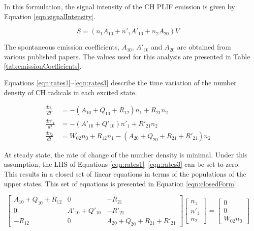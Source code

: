 In this formulation, the signal intensity of the CH PLIF emission is given by Equation \ref{eqn:signalIntensity}.

\begin{equation}
S = ( n_1A_{10} + n'_1A'_{10} + n_2A_{20} )V
\label{eqn:signalIntensity}
\end{equation}

The spontaneous emission coefficients, \(A_{10}\), \(A'_{10}\) and \(A_{20}\) are obtained from various published papers\cite{1985-garland-a,1996-luque-b,2005-richmond}.
The values used for this analysis are presented in Table \ref{tab:emissionCoefficients}.



Equations \ref{eqn:rates1}--\ref{eqn:rates3} describe the time variation of the number density of CH radicals in each excited state.

\begin{align}
\frac{dn_1}{dt} &= -( A_{10} + Q_{10} + R_{12} )n_1 + R_{21}n_2
\label{eqn:rates1}\\
\frac{dn'_1}{dt} &= -( A'_{10} + Q'_{10} )n'_1 + R'_{21}n_2
\label{eqn:rates2}\\
\frac{dn_2}{dt} &= W_{02}n_0 + R_{12}n_1 - ( A_{20} + Q_{20} + R_{21} + R'_{21} )n_2
\label{eqn:rates3}
\end{align}

At steady state, the rate of change of the number density is minimal.
Under this assumption, the LHS of Equations \ref{eqn:rates1}--\ref{eqn:rates3} can be set to zero.
This results in a closed set of linear equations in terms of the populations of the upper states.
This set of equations is presented in Equation \ref{eqn:closedForm}.

\begin{equation}
  \left[
    \begin{matrix}
      A_{10} + Q_{10} + R_{12} & 0 & -R_{21}\\
      0 & A'_{10} + Q'_{10} & -R'_{21}\\
      -R_{12} & 0 & A_{20} + Q_{20} + R_{21} + R'_{21}
    \end{matrix}
  \right]\left[
    \begin{matrix}
      n_1\\
      n'_1\\
      n_2
    \end{matrix}
  \right] = \left[
    \begin{matrix}
      0\\
      0\\
      W_{02}n_0
    \end{matrix}
  \right]
  \label{eqn:closedForm}
\end{equation}

